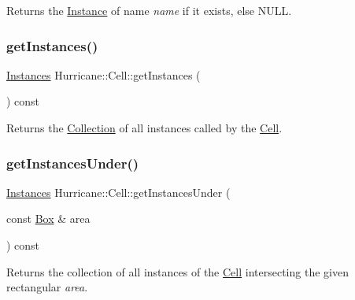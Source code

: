 Returns the \mbox{\hyperlink{classHurricane_1_1Instance}{Instance}} of name {\itshape name} if it exists, else {\ttfamily N\+U\+LL}. \mbox{\label{classHurricane_1_1Cell_aa85b3992431b672827167c5d9cb622f2}} 
\subsubsection{\texorpdfstring{get\+Instances()}{getInstances()}}
{\footnotesize\ttfamily \mbox{\hyperlink{namespaceHurricane_ac9436b03a2926f34ad6863deae2baadc}{Instances}} Hurricane\+::\+Cell\+::get\+Instances (\begin{DoxyParamCaption}{ }\end{DoxyParamCaption}) const\hspace{0.3cm}{\ttfamily [inline]}}

Returns the \mbox{\hyperlink{classHurricane_1_1Collection}{Collection}} of all instances called by the \mbox{\hyperlink{classHurricane_1_1Cell}{Cell}}. \mbox{\label{classHurricane_1_1Cell_a5eb16d9d0f340ad71b81d794f6f8525f}} 
\subsubsection{\texorpdfstring{get\+Instances\+Under()}{getInstancesUnder()}}
{\footnotesize\ttfamily \mbox{\hyperlink{namespaceHurricane_ac9436b03a2926f34ad6863deae2baadc}{Instances}} Hurricane\+::\+Cell\+::get\+Instances\+Under (\begin{DoxyParamCaption}\item[{const \mbox{\hyperlink{classHurricane_1_1Box}{Box}} \&}]{area }\end{DoxyParamCaption}) const}

Returns the collection of all instances of the \mbox{\hyperlink{classHurricane_1_1Cell}{Cell}} intersecting the given rectangular {\itshape area}. \mbox{\label{classHurricane_1_1Cell_a7e51bee5db73dd44f788e591a5c175c8}} 
